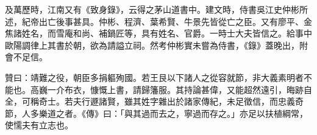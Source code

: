 \begin{pinyinscope}
及萬歷時，江南又有《致身錄》，云得之茅山道書中。建文時，侍書吳江史仲彬所述，紀帝出亡後事甚具。仲彬、程濟、葉希賢、牛景先皆從亡之臣。又有廖平、金焦諸姓名，而雪庵和尚、補鍋匠等，具有姓名、官爵。一時士大夫皆信之。給事中歐陽調律上其書於朝，欲為請謚立祠。然考仲彬實未嘗為侍書，《錄》蓋晚出，附會不足信。

贊曰：靖難之役，朝臣多捐軀殉國。若王艮以下諸人之從容就節，非大義素明者不能也。高巍一介布衣，慷慨上書，請歸籓服。其持論甚偉，又能超然遠引，晦跡自全，可稱奇士。若夫行遯諸賢，雖其姓字雜出於諸家傳紀，未足徵信，而忠義奇節，人多樂道之者。《傳》曰：「與其過而去之，寧過而存之。」亦足以扶植綱常，使懦夫有立志也。


\end{pinyinscope}